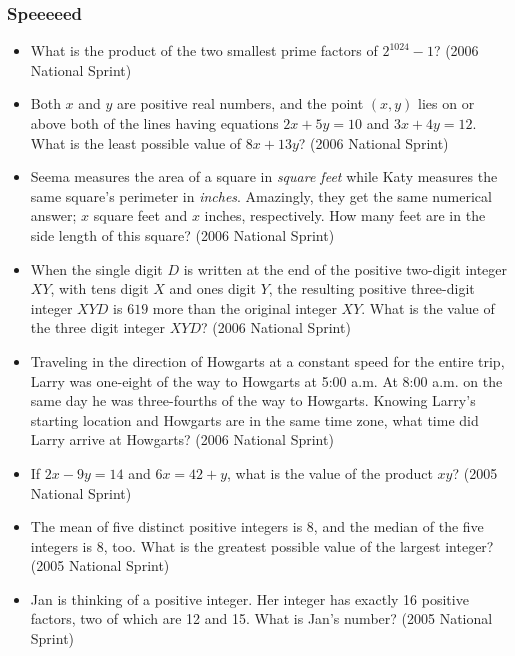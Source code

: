\documentclass{article}
\begin{document}
\begin{itemize}
\subsubsection{Speeeeed}
\begin{itemize}
\item What is the product of the two smallest prime factors of $2^{1024}-1$? (2006 National Sprint)

\item Both $x$ and $y$ are positive real numbers, and the point $(x,y)$ lies on or above both of the lines having equations $2x+5y=10$ and $3x+4y=12$. What is the least possible value of $8x+13y$? (2006 National Sprint)

\item Seema measures the area of a square in \textit{square feet} while Katy measures the same square's perimeter in \textit{inches}. Amazingly, they get the same numerical answer; $x$ square feet and $x$ inches, respectively. How many feet are in the side length of this square? (2006 National Sprint)

\item When the single digit $D$ is written at the end of the positive two-digit integer $XY$, with tens digit $X$ and ones digit $Y$, the resulting positive three-digit integer $XYD$ is $619$ more than the original integer $XY$. What is the value of the three digit integer $XYD$? (2006 National Sprint)

\item Traveling in the direction of Howgarts at a constant speed for the entire trip, Larry was one-eight of the way to Howgarts at 5:00 a.m. At 8:00 a.m. on the same day he was three-fourths of the way to Howgarts. Knowing Larry's starting location and Howgarts are in the same time zone, what time did Larry arrive at Howgarts? (2006 National Sprint)

\item If $2x-9y=14$ and $6x=42+y$, what is the value of the product $xy$? (2005 National Sprint)

\item The mean of five distinct positive integers is $8$, and the median of the five integers is $8$, too. What is the greatest possible value of the largest integer? (2005 National Sprint)

\item Jan is thinking of a positive integer. Her integer has exactly 16 positive factors, two of which are 12 and 15. What is Jan's number? (2005 National Sprint)


\end{itemize}
\end{itemize}
\end{document}
